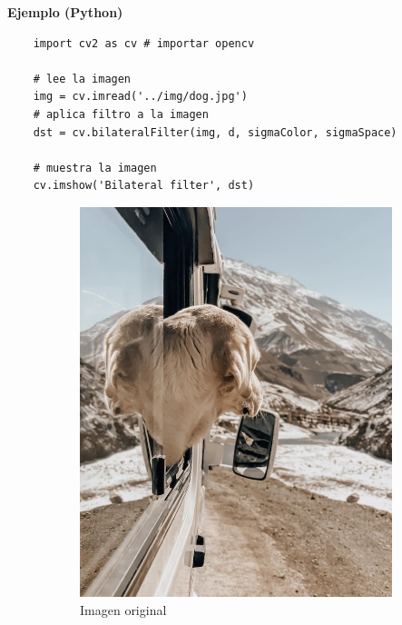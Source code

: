 \documentclass[a4paper, 12pt]{article}
\begin{document}
\textbf{Ejemplo (Python)}
\begin{lstlisting}
    import cv2 as cv # importar opencv

    # lee la imagen
    img = cv.imread('../img/dog.jpg')
    # aplica filtro a la imagen
    dst = cv.bilateralFilter(img, d, sigmaColor, sigmaSpace)

    # muestra la imagen
    cv.imshow('Bilateral filter', dst)
\end{lstlisting}

\begin{figure}[!ht]
    \centering
    \begin{subfigure}{0.4\textwidth}
        \includegraphics[width=\textwidth]{img/dog.jpg}
        \caption{Imagen original}
    \end{subfigure}
    \begin{subfigure}{0.4\textwidth}

\end{subfigure}
\end{figure}
\end{document}
